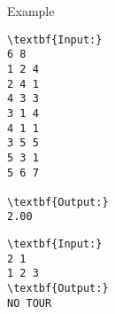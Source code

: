 Example
\begin{verbatim}
\textbf{Input:}
6 8
1 2 4 
2 4 1 
4 3 3 
3 1 4 
4 1 1 
3 5 5 
5 3 1 
5 6 7

\textbf{Output:}
2.00
\end{verbatim}


\begin{verbatim}
\textbf{Input:}
2 1
1 2 3
\textbf{Output:}
NO TOUR
\end{verbatim}